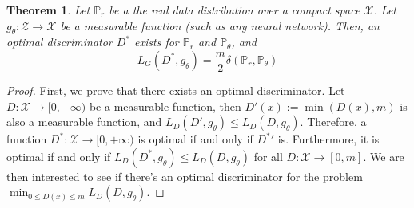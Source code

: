 \documentclass{article} %
\newcommand\PP{\mathbb{P}}
\newtheorem{theo}{Theorem}
\theoremstyle{definition}
\theoremstyle{definition}
\begin{document}
\begin{appendices}
\begin{theo} Let $\PP_r$ be a the real data distribution over
a compact space $\mathcal{X}$.
Let $g_\theta: \mathcal{Z} \rightarrow \mathcal{X}$ be a
measurable function (such as any neural network). Then, 
an optimal discriminator $D^*$ exists for $\PP_r$ and
$\PP_\theta$, and 
$$ L_G(D^*, g_\theta) = \frac{m}{2} \delta(\PP_r, \PP_\theta) $$
\end{theo}
\begin{proof} First, we prove that there exists an optimal
discriminator. Let $D: \mathcal{X} \rightarrow [0, +\infty)$
be a measurable function, then $D'(x) := \min(D(x), m)$ is
also a measurable function, and $L_D(D', g_\theta) \leq L_D(D, g_\theta)$.
Therefore, a function $D^*: \mathcal{X} \rightarrow [0, +\infty)$ is
optimal if and only if ${D^*}'$ is. Furthermore, it is optimal if and
only if $L_D(D^*, g_\theta) \leq L_D(D, g_\theta)$ for all $D: \mathcal{X}
\rightarrow [0, m]$. We are then interested to see if there's an
optimal discriminator for the problem
$\min_{0 \leq D(x) \leq m} L_D(D, g_\theta)$.


\end{proof}
\end{appendices}
\end{document}
